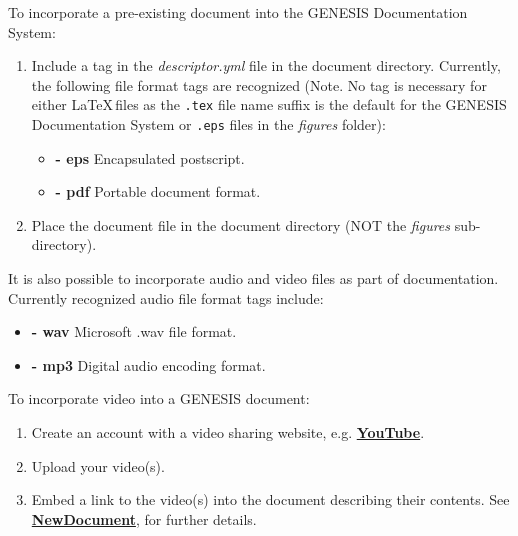 \documentclass[12pt]{article}
\begin{document}
To incorporate a pre-existing document into the GENESIS Documentation System:

\begin{enumerate}

\item Include a tag in the {\it descriptor.yml} file in the document directory. Currently, the following file format tags are recognized (Note. No tag is necessary for either \LaTeX\,files as the {\tt .tex} file name suffix is the default for the GENESIS Documentation System or {\tt .eps} files in the {\it figures} folder):

\begin{itemize}

\item[]{\bf - eps} Encapsulated postscript.
\item[]{\bf - pdf} Portable document format.

\end{itemize}

\item Place the document file in the document directory (NOT the {\it figures} sub-directory).

\end{enumerate}

It is also possible to incorporate audio and video files as part of documentation. Currently recognized audio file format tags include:

\begin{itemize}
   \item[]{\bf - wav} Microsoft .wav file format.
   \item[]{\bf - mp3} Digital audio encoding format.
\end{itemize}

To incorporate video into a GENESIS document: 

\begin{enumerate}
   \item Create an account with a video sharing website, e.g. \href{http://www.youtube.com/watch?v=1n8DxTk2gVM}{\bf YouTube}.
   \item Upload your video(s).
   \item Embed a link to the video(s) into the document describing their contents. See \href{../NewDocument/NewDocument.tex}{\bf NewDocument}, for further details.
\end{enumerate}
\end{document}
